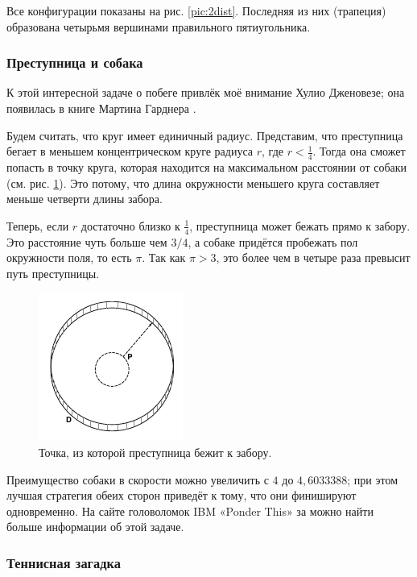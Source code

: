 Все конфигурации показаны на рис. \ref{pic:2dist}.
Последняя из них (трапеция) образована четырьмя вершинами правильного пятиугольника.


\subsubsection*{Преступница и собака}

К этой интересной задаче о побеге привлёк моё внимание Хулио Дженовезе;
она появилась в книге Мартина Гарднера \cite{24}.

Будем считать, что круг имеет единичный радиус.
Представим, что преступница бегает в меньшем концентрическом круге радиуса $r$, где $r < \tfrac14$.
Тогда она сможет попасть в точку круга, которая находится на максимальном расстоянии от собаки (см. рис. \ref{pic:dog}).
Это потому, что длина окружности меньшего круга составляет меньше четверти длины забора.

Теперь, если $r$ достаточно близко к $\tfrac14$, преступница может бежать прямо к забору.
Это расстояние чуть больше чем $3/4$, а собаке придётся пробежать пол окружности поля, то есть $\pi$.
Так как $\pi > 3$, это более чем в четыре раза превысит путь преступницы.

\begin{figure}[h!]
\centering
\includegraphics[scale=1]{pics/dog}
\caption{Точка, из которой преступница бежит к забору.}
\label{pic:dog}
\end{figure}

Преимущество собаки в скорости можно увеличить с $4$ до $4{,}6033388$; при этом лучшая стратегия обеих сторон приведёт к тому, что они финишируют одновременно.
На сайте головоломок IBM «Ponder This» за \cite[май 2001]{ponder-this} можно найти больше информации об этой задаче.

\subsubsection*{Теннисная загадка}

